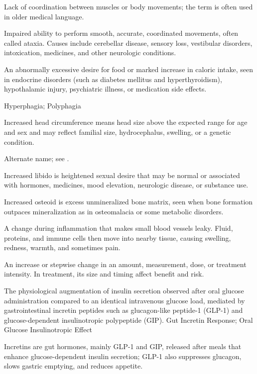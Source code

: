  Lack of coordination between muscles or body movements; the term is often used in older medical language.

 Impaired ability to perform smooth, accurate, coordinated movements, often called ataxia. Causes include cerebellar disease, sensory loss, vestibular disorders, intoxication, medicines, and other neurologic conditions.

 An abnormally excessive desire for food or marked increase in caloric intake, seen in endocrine disorders (such as diabetes mellitus and hyperthyroidism), hypothalamic injury, psychiatric illness, or medication side effects.

\synonyms
Hyperphagia; Polyphagia

 Increased head circumference means head size above the expected range for age and sex and may reflect familial size, hydrocephalus, swelling, or a genetic condition.

 Alternate name; see .

 Increased libido is heightened sexual desire that may be normal or associated with hormones, medicines, mood elevation, neurologic disease, or substance use.

 Increased osteoid is excess unmineralized bone matrix, seen when bone formation outpaces mineralization as in osteomalacia or some metabolic disorders.

 A change during inflammation that makes small blood vessels leaky. Fluid, proteins, and immune cells then move into nearby tissue, causing swelling, redness, warmth, and sometimes pain.

 An increase or stepwise change in an amount, measurement, dose, or treatment intensity. In treatment, its size and timing affect benefit and risk.

 The physiological augmentation of insulin secretion observed after oral glucose administration compared to an identical intravenous glucose load, mediated by gastrointestinal incretin peptides such as glucagon-like peptide-1 (GLP-1) and glucose-dependent insulinotropic polypeptide (GIP).
\synonyms
Gut Incretin Response; Oral Glucose Insulinotropic Effect

 Incretins are gut hormones, mainly GLP-1 and GIP, released after meals that enhance glucose-dependent insulin secretion; GLP-1 also suppresses glucagon, slows gastric emptying, and reduces appetite.

